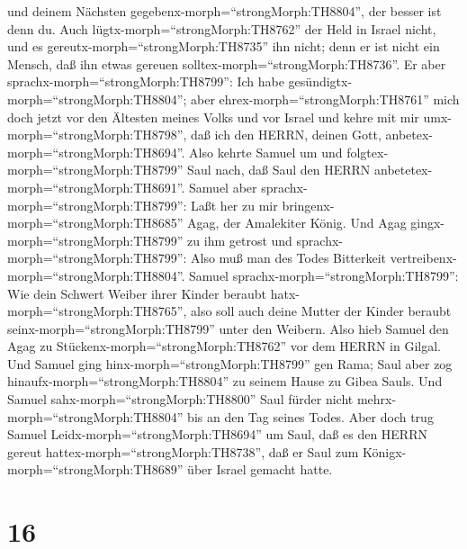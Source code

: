 und deinem Nächsten gegebenx-morph=``strongMorph:TH8804'', der besser
ist denn du.  Auch lügtx-morph=``strongMorph:TH8762'' der
Held in Israel nicht, und es gereutx-morph=``strongMorph:TH8735'' ihn
nicht; denn er ist nicht ein Mensch, daß ihn etwas gereuen
solltex-morph=``strongMorph:TH8736''.  Er aber
sprachx-morph=``strongMorph:TH8799'': Ich habe
gesündigtx-morph=``strongMorph:TH8804''; aber
ehrex-morph=``strongMorph:TH8761'' mich doch jetzt vor den Ältesten
meines Volks und vor Israel und kehre mit mir
umx-morph=``strongMorph:TH8798'', daß ich den HERRN, deinen Gott,
anbetex-morph=``strongMorph:TH8694''.  Also kehrte Samuel
um und folgtex-morph=``strongMorph:TH8799'' Saul nach, daß Saul den
HERRN anbetetex-morph=``strongMorph:TH8691''.  Samuel aber
sprachx-morph=``strongMorph:TH8799'': Laßt her zu mir
bringenx-morph=``strongMorph:TH8685'' Agag, der Amalekiter König. Und
Agag gingx-morph=``strongMorph:TH8799'' zu ihm getrost und
sprachx-morph=``strongMorph:TH8799'': Also muß man des Todes Bitterkeit
vertreibenx-morph=``strongMorph:TH8804''.  Samuel
sprachx-morph=``strongMorph:TH8799'': Wie dein Schwert Weiber ihrer
Kinder beraubt hatx-morph=``strongMorph:TH8765'', also soll auch deine
Mutter der Kinder beraubt seinx-morph=``strongMorph:TH8799'' unter den
Weibern. Also hieb Samuel den Agag zu
Stückenx-morph=``strongMorph:TH8762'' vor dem HERRN in Gilgal.
 Und Samuel ging hinx-morph=``strongMorph:TH8799'' gen
Rama; Saul aber zog hinaufx-morph=``strongMorph:TH8804'' zu seinem Hause
zu Gibea Sauls.  Und Samuel
sahx-morph=``strongMorph:TH8800'' Saul fürder nicht
mehrx-morph=``strongMorph:TH8804'' bis an den Tag seines Todes. Aber
doch trug Samuel Leidx-morph=``strongMorph:TH8694'' um Saul, daß es den
HERRN gereut hattex-morph=``strongMorph:TH8738'', daß er Saul zum
Königx-morph=``strongMorph:TH8689'' über Israel gemacht hatte.

\hypertarget{section-15}{%
\section{16}\label{section-15}}

